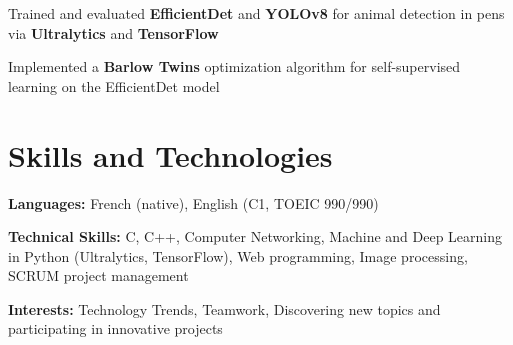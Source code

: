         \begin{onecolentry}
            \begin{highlights}
                \item Trained and evaluated \textbf{EfficientDet} and \textbf{YOLOv8} for animal detection in pens via \textbf{Ultralytics} and \textbf{TensorFlow}
                \item Implemented a \textbf{Barlow Twins} optimization algorithm for self-supervised learning on the EfficientDet model
            \end{highlights}
        \end{onecolentry}

	
    \section{Skills and Technologies}
        \begin{onecolentry}
            \textbf{Languages:} French (native), English (C1, TOEIC 990/990) 
        \end{onecolentry}

        \begin{onecolentry}
            \textbf{Technical Skills:} C, C++, Computer Networking, Machine and Deep Learning in Python (Ultralytics, TensorFlow), Web programming, Image processing, SCRUM project management
        \end{onecolentry}

        \begin{onecolentry}
            \textbf{Interests:} Technology Trends, Teamwork, Discovering new topics and participating in innovative projects
        \end{onecolentry}
